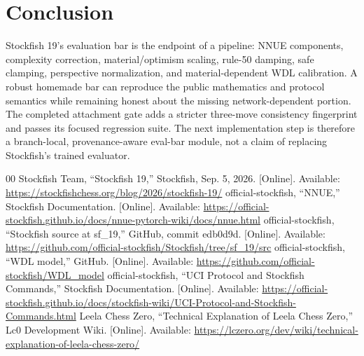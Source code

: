 \documentclass[10pt,conference]{IEEEtran}
\begin{document}
\section{Conclusion}
Stockfish 19's evaluation bar is the endpoint of a pipeline: NNUE components, complexity correction, material/optimism scaling, rule-50 damping, safe clamping, perspective normalization, and material-dependent WDL calibration. A robust homemade bar can reproduce the public mathematics and protocol semantics while remaining honest about the missing network-dependent portion. The completed attachment gate adds a stricter three-move consistency fingerprint and passes its focused regression suite. The next implementation step is therefore a branch-local, provenance-aware eval-bar module, not a claim of replacing Stockfish's trained evaluator.

\begin{thebibliography}{00}
 Stockfish Team, ``Stockfish 19,'' Stockfish, Sep. 5, 2026. [Online]. Available: \url{https://stockfishchess.org/blog/2026/stockfish-19/}
 official-stockfish, ``NNUE,'' Stockfish Documentation. [Online]. Available: \url{https://official-stockfish.github.io/docs/nnue-pytorch-wiki/docs/nnue.html}
 official-stockfish, ``Stockfish source at sf\_19,'' GitHub, commit edb0d9d. [Online]. Available: \url{https://github.com/official-stockfish/Stockfish/tree/sf_19/src}
 official-stockfish, ``WDL model,'' GitHub. [Online]. Available: \url{https://github.com/official-stockfish/WDL_model}
 official-stockfish, ``UCI Protocol and Stockfish Commands,'' Stockfish Documentation. [Online]. Available: \url{https://official-stockfish.github.io/docs/stockfish-wiki/UCI-Protocol-and-Stockfish-Commands.html}
 Leela Chess Zero, ``Technical Explanation of Leela Chess Zero,'' Lc0 Development Wiki. [Online]. Available: \url{https://lczero.org/dev/wiki/technical-explanation-of-leela-chess-zero/}
\end{thebibliography}
\end{document}
